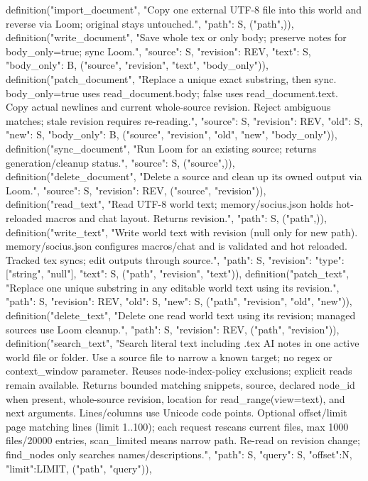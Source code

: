     definition("import_document", "Copy one external UTF-8 file into this world and reverse via Loom; original stays untouched.", {"path": S}, ("path",)),
    definition("write_document", "Save whole tex or only body; preserve notes for body_only=true; sync Loom.", {"source": S, "revision": REV, "text": S, "body_only": B}, ("source", "revision", "text", "body_only")),
    definition("patch_document", "Replace a unique exact substring, then sync. body_only=true uses read_document.body; false uses read_document.text. Copy actual newlines and current whole-source revision. Reject ambiguous matches; stale revision requires re-reading.", {"source": S, "revision": REV, "old": S, "new": S, "body_only": B}, ("source", "revision", "old", "new", "body_only")),
    definition("sync_document", "Run Loom for an existing source; returns generation/cleanup status.", {"source": S}, ("source",)),
    definition("delete_document", "Delete a source and clean up its owned output via Loom.", {"source": S, "revision": REV}, ("source", "revision")),
    definition("read_text", "Read UTF-8 world text; memory/socius.json holds hot-reloaded macros and chat layout. Returns revision.", {"path": S}, ("path",)),
    definition("write_text", "Write world text with revision (null only for new path). memory/socius.json configures macros/chat and is validated and hot reloaded. Tracked tex syncs; edit outputs through source.", {"path": S, "revision": {"type": ["string", "null"]}, "text": S}, ("path", "revision", "text")),
    definition("patch_text", "Replace one unique substring in any editable world text using its revision.", {"path": S, "revision": REV, "old": S, "new": S}, ("path", "revision", "old", "new")),
    definition("delete_text", "Delete one read world text using its revision; managed sources use Loom cleanup.", {"path": S, "revision": REV}, ("path", "revision")),
    definition("search_text", "Search literal text including .tex AI notes in one active world file or folder. Use a source file to narrow a known target; no regex or context_window parameter. Reuses node-index-policy exclusions; explicit reads remain available. Returns bounded matching snippets, source, declared node_id when present, whole-source revision, location for read_range(view=text), and next arguments. Lines/columns use Unicode code points. Optional offset/limit page matching lines (limit 1..100); each request rescans current files, max 1000 files/20000 entries, scan_limited means narrow path. Re-read on revision change; find_nodes only searches names/descriptions.", {"path": S, "query": S, "offset":N, "limit":LIMIT}, ("path", "query")),
